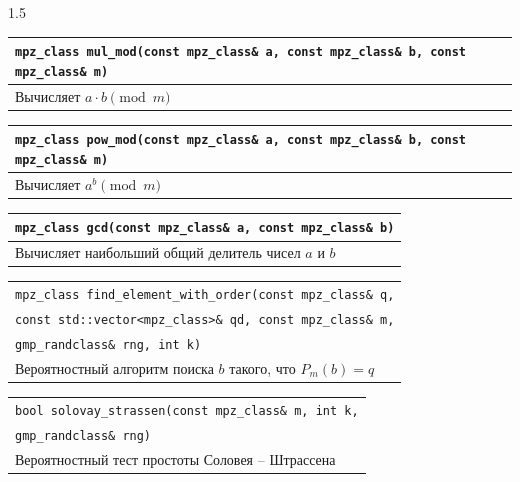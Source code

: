 \documentclass[14pt,a4paper]{extarticle}
\begin{document}
\begin{spacing}{1.5}
\renewcommand{\arraystretch}{1.2}

\noindent\begin{tabularx}{\textwidth}{|X|}
\hline
\texttt{mpz\_class mul\_mod(const mpz\_class\& a, const mpz\_class\& b, const mpz\_class\& m)} \\
\hline
Вычисляет \(a \cdot b \pmod m\) \\
\hline
\end{tabularx}

\vspace{0.2cm}
\noindent\begin{tabularx}{\textwidth}{|X|}
\hline
\texttt{mpz\_class pow\_mod(const mpz\_class\& a, const mpz\_class\& b, const mpz\_class\& m)} \\
\hline
Вычисляет \(a^b \pmod m\) \\
\hline
\end{tabularx}

\vspace{0.2cm}
\noindent\begin{tabularx}{\textwidth}{|X|}
\hline
\texttt{mpz\_class gcd(const mpz\_class\& a, const mpz\_class\& b)} \\
\hline
Вычисляет наибольший общий делитель чисел \(a\) и \(b\) \\
\hline
\end{tabularx}

\vspace{0.2cm}
\noindent\begin{tabularx}{\textwidth}{|X|}
\hline
\texttt{mpz\_class find\_element\_with\_order(const mpz\_class\& q,}\\
\texttt{const std::vector<mpz\_class>\& qd, const mpz\_class\& m,}\\
\texttt{gmp\_randclass\& rng, int k)} \\
\hline
Вероятностный алгоритм поиска \(b\) такого, что \(P_m(b) = q\) \\
\hline
\end{tabularx}

\vspace{0.2cm}
\noindent\begin{tabularx}{\textwidth}{|X|}
\hline
\texttt{bool solovay\_strassen(const mpz\_class\& m, int k,}\\
\texttt{gmp\_randclass\& rng)} \\
\hline
Вероятностный тест простоты Соловея – Штрассена \\
\hline
\end{tabularx}


\end{spacing}
\end{document}
